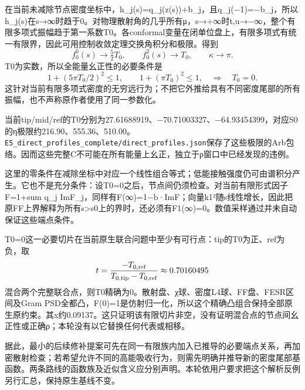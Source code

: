 \documentclass[
  11pt,
  a4paper,
]{article}
\begin{document}
在当前未减除节点密度坐标中，h\_j(s)=q\_j(z(s))+b\_j，且q\_j(−1)=−b\_j，所以h\_j(s)在s→∞时趋于0。对物理散射角的几乎所有μ，s→+∞时t,u→−∞，整个有限多项式振幅趋于第一系数T0。各conformal变量在闭单位盘上，有限多项式有统一有限界，因此可用控制收敛定理交换角积分和极限。得到
\[
f_0^0(s)\longrightarrow\tfrac52T_0,
\qquad f_0^2(s)\longrightarrow T_0,
\qquad \kappa\longrightarrow\pi.
\] T0为实数，所以全能量幺正性的必要条件是 \[
1+(5\pi T_0/2)^2\le1,\qquad 1+(\pi T_0)^2\le1,
\quad\Longrightarrow\quad T_0=0.
\]
这针对当前有限多项式密度的无穷远行为；不把它外推给具有不同密度尾部的所有振幅，也不声称原作者使用了同一参数化。

当前tip/mid/ref的T0分别为27.61688919、−70.71003327、−64.93454399，对应S0的η极限约216.90、555.36、510.00。\texttt{E5\_direct\_profiles\_complete/direct\_profiles.json}保存了这些极限的Arb包络。因而这些完整C不可能在所有能量上幺正，独立于ρ窗口中已经发现的违例。

这里的零条件在减除坐标中对应一个线性组合等式；低能接触强度仍可由谱积分产生。它也不是充分条件：设T0=0之后，节点间仍须检查。对当前有限形式因子F=1+sum
q\_j
ImF\_j，同样有F(∞)=1−b·ImF；向量k1²随s线性增长，因此把原FF上界解释为所有s\textgreater s0上的界时，还必须有F1(∞)=0。数值采样通过并未自动保证这些端点条件。

T0=0这一必要切片在当前原生联合问题中至少有可行点：tip的T0为正、ref为负，取
\[
t={-T_{0,\mathrm{ref}}\over T_{0,\mathrm{tip}}-T_{0,\mathrm{ref}}}\approx0.70160495
\]
混合两个完整联合点，则T0精确为0。散射盘、χ球、密度L4球、FF盘、FESR区间及Gram
PSD全都凸，F(0)=1是仿射归一化，所以这个精确凸组合保持全部原生原约束。其x约0.09137。这只证明该有限切片非空，没有证明混合点的节点间幺正性或正确ρ；本轮没有以它替换任何代表或相移。

据此，最小的后续修补提案可先在同一有限族内加入已推导的必要端点关系，再加密散射检查；若希望允许不同的高能吸收行为，则需先明确并推导新的密度尾部基函数。两条路线的函数族及近似含义应分别声明。本轮依用户要求把这个解析反例另行汇总，保持原生基线不变。
\end{document}
